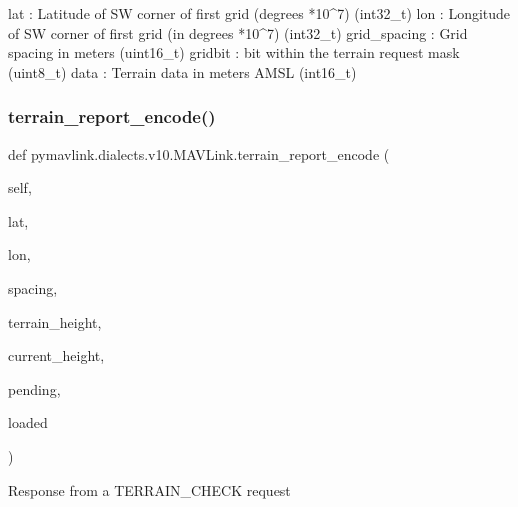 \begin{DoxyVerb}
\begin{DoxyVerb}
\begin{DoxyVerb}
\begin{DoxyVerb}
\begin{DoxyVerb}
\begin{DoxyVerb}
\begin{DoxyVerb}
\begin{DoxyVerb}
\begin{DoxyVerb}
\begin{DoxyVerb}
\begin{DoxyVerb}
lat                       : Latitude of SW corner of first grid (degrees *10^7) (int32_t)
lon                       : Longitude of SW corner of first grid (in degrees *10^7) (int32_t)
grid_spacing              : Grid spacing in meters (uint16_t)
gridbit                   : bit within the terrain request mask (uint8_t)
data                      : Terrain data in meters AMSL (int16_t)\end{DoxyVerb}
 \mbox{\label{classpymavlink_1_1dialects_1_1v10_1_1MAVLink_a400e7fdbb568ae238f1004e63a0c8f0a}} 
\subsubsection{\texorpdfstring{terrain\+\_\+report\+\_\+encode()}{terrain\_report\_encode()}}
{\footnotesize\ttfamily def pymavlink.\+dialects.\+v10.\+M\+A\+V\+Link.\+terrain\+\_\+report\+\_\+encode (\begin{DoxyParamCaption}\item[{}]{self,  }\item[{}]{lat,  }\item[{}]{lon,  }\item[{}]{spacing,  }\item[{}]{terrain\+\_\+height,  }\item[{}]{current\+\_\+height,  }\item[{}]{pending,  }\item[{}]{loaded }\end{DoxyParamCaption})}

\begin{DoxyVerb}Response from a TERRAIN_CHECK request


\end{DoxyVerb}
\end{DoxyVerb}
\end{DoxyVerb}
\end{DoxyVerb}
\end{DoxyVerb}
\end{DoxyVerb}
\end{DoxyVerb}
\end{DoxyVerb}
\end{DoxyVerb}
\end{DoxyVerb}
\end{DoxyVerb}
